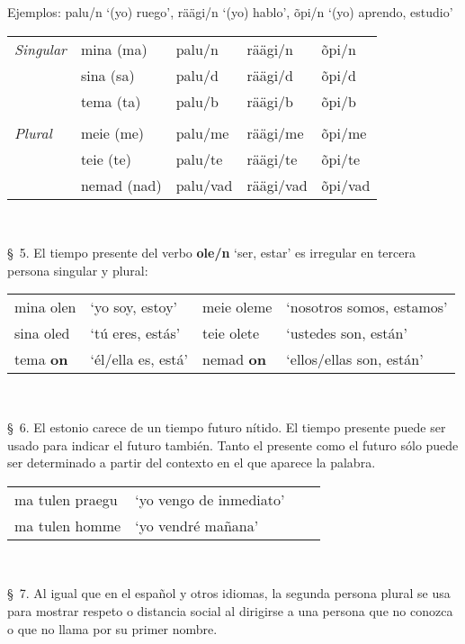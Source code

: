 Ejemplos: palu/n `(yo) ruego', räägi/n `(yo) hablo', õpi/n `(yo) aprendo, estudio'\\

\begin{tabular}{ l l l l l }
	\emph{Singular}	& mina (ma)		& palu/n	& räägi/n	& õpi/n \\
					& sina (sa)		& palu/d	& räägi/d	& õpi/d \\
					& tema (ta)		& palu/b	& räägi/b	& õpi/b \\
					& & & & \\
	\emph{Plural}	& meie (me)		& palu/me	& räägi/me	& õpi/me \\
					& teie (te)		& palu/te	& räägi/te	& õpi/te \\
					& nemad (nad)	& palu/vad	& räägi/vad	& õpi/vad 
\end{tabular}\\ \bigskip

\S\ 5. El tiempo presente del verbo \textbf{ole/n} `ser, estar' es irregular en tercera persona singular y plural:\\

\begin{tabular}{ l l l l }
	mina olen 			& `yo soy, estoy'		& meie oleme 				& `nosotros somos, estamos' \\
	sina oled 			& `tú eres, estás' 		& teie olete 				& `ustedes son, están' \\
	tema \textbf{on} 	& `él/ella es, está'	& nemad \textbf{on} 		& `ellos/ellas son, están'
\end{tabular}\\ \bigskip

\S\ 6. El estonio carece de un tiempo futuro nítido. El tiempo presente puede ser usado para indicar el futuro también. Tanto el presente como el futuro sólo puede ser determinado a partir del contexto en el que aparece la palabra.\\

\begin{tabular}{ l l l l }
	ma tulen praegu & `yo vengo de inmediato' \\
	ma tulen homme 	& `yo vendré mañana'
\end{tabular}\\ \bigskip

\S\ 7. Al igual que en el español y otros idiomas, la segunda persona plural se usa para mostrar respeto o distancia social al dirigirse a una persona que no conozca o que no llama por su primer nombre.\\

